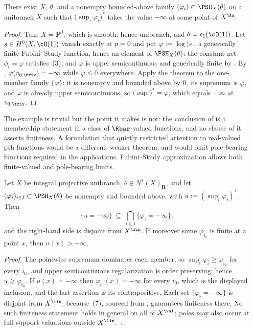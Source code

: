 \begin{proposition}
\label{prop:ch45-envelope-can-be-minus-infinity}
There exist $X$, $\theta$, and a nonempty bounded-above family
$(\varphi_i)\subset\PSH_X(\theta)$ on a unibranch $X$ such that
$\bigl(\sup_i\varphi_i\bigr)^*$ takes the value $-\infty$ at some point
of $X^{\An}$.
\end{proposition}

\begin{proof}
Take $X=\mathbf P^1$, which is smooth, hence unibranch, and
$\theta=c_1(\cO(1))$.  Let $s\in H^0(X,\cO(1))$ vanish exactly at
$p=0$ and put $\varphi:=\log|s|$, a generically finite Fubini--Study
function, hence an element of $\PSH_X(\theta)$: the constant net
$\phi_i=\varphi$ satisfies \,(3), and $\varphi$ is
upper semicontinuous and generically finite by
.  By
, $\varphi(v_{0,\triv})=-\infty$ while
$\varphi\le0$ everywhere.  Apply the theorem to the one-member family
$\{\varphi\}$: it is nonempty and bounded above by $0$, its supremum is
$\varphi$, and $\varphi$ is already upper semicontinuous, so
$\bigl(\sup\bigr)^*=\varphi$, which equals $-\infty$ at
$v_{0,\triv}$.
\end{proof}

The example is trivial but the point it makes is not: the conclusion of
 is a membership statement in a class of
$\Rbar$-valued functions, and no clause of it asserts finiteness.  A
formulation that quietly restricted attention to real-valued psh functions
would be a different, weaker theorem, and would omit pole-bearing functions required in the
applications.  Fubini--Study approximation allows both finite-valued and
pole-bearing limits.

\begin{proposition}
\label{prop:ch45-pole-locus}
Let $X$ be integral projective unibranch, $\theta\in N^1(X)_{\mathbf R}$,
and let $(\varphi_i)_{i\in I}\subset\PSH_X(\theta)$ be nonempty and
bounded above, with $u:=(\sup_i\varphi_i)^*$.  Then
\[
 \{u=-\infty\}\ \subseteq\ \bigcap_{i\in I}\{\varphi_i=-\infty\},
\]
and the right-hand side is disjoint from $X^{\lin}$.  If moreover some
$\varphi_{i_0}$ is finite at a point $x$, then $u(x)>-\infty$.
\end{proposition}

\begin{proof}
The pointwise supremum dominates each member, so
$\sup_i\varphi_i\ge\varphi_{i_0}$ for every $i_0$, and upper
semicontinuous regularization is order preserving; hence
$u\ge\varphi_{i_0}$.  If $u(x)=-\infty$ then
$\varphi_{i_0}(x)=-\infty$ for every $i_0$, which is the displayed
inclusion, and the last assertion is its contrapositive.  Each set
$\{\varphi_i=-\infty\}$ is disjoint from $X^{\lin}$, because
\,(7), sourced from
\cite[Corollary~4.17]{BJ22}, guarantees finiteness there.  No such
finiteness statement holds in general on all of $X^{\val}$; poles may
also occur at full-support valuations outside $X^{\lin}$.
\end{proof}


